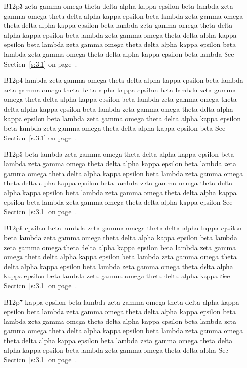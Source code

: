 B12p3 zeta gamma omega theta delta alpha kappa epsilon beta lambda zeta gamma omega theta delta alpha kappa epsilon beta lambda zeta gamma omega theta delta alpha kappa epsilon beta lambda zeta gamma omega theta delta alpha kappa epsilon beta lambda zeta gamma omega theta delta alpha kappa epsilon beta lambda zeta gamma omega theta delta alpha kappa epsilon beta lambda zeta gamma omega theta delta alpha kappa epsilon beta lambda See Section~\ref{s:3.1} on page~\pageref{s:3.1}.

B12p4 lambda zeta gamma omega theta delta alpha kappa epsilon beta lambda zeta gamma omega theta delta alpha kappa epsilon beta lambda zeta gamma omega theta delta alpha kappa epsilon beta lambda zeta gamma omega theta delta alpha kappa epsilon beta lambda zeta gamma omega theta delta alpha kappa epsilon beta lambda zeta gamma omega theta delta alpha kappa epsilon beta lambda zeta gamma omega theta delta alpha kappa epsilon beta See Section~\ref{s:3.1} on page~\pageref{s:3.1}.

B12p5 beta lambda zeta gamma omega theta delta alpha kappa epsilon beta lambda zeta gamma omega theta delta alpha kappa epsilon beta lambda zeta gamma omega theta delta alpha kappa epsilon beta lambda zeta gamma omega theta delta alpha kappa epsilon beta lambda zeta gamma omega theta delta alpha kappa epsilon beta lambda zeta gamma omega theta delta alpha kappa epsilon beta lambda zeta gamma omega theta delta alpha kappa epsilon See Section~\ref{s:3.1} on page~\pageref{s:3.1}.

B12p6 epsilon beta lambda zeta gamma omega theta delta alpha kappa epsilon beta lambda zeta gamma omega theta delta alpha kappa epsilon beta lambda zeta gamma omega theta delta alpha kappa epsilon beta lambda zeta gamma omega theta delta alpha kappa epsilon beta lambda zeta gamma omega theta delta alpha kappa epsilon beta lambda zeta gamma omega theta delta alpha kappa epsilon beta lambda zeta gamma omega theta delta alpha kappa See Section~\ref{s:3.1} on page~\pageref{s:3.1}.

B12p7 kappa epsilon beta lambda zeta gamma omega theta delta alpha kappa epsilon beta lambda zeta gamma omega theta delta alpha kappa epsilon beta lambda zeta gamma omega theta delta alpha kappa epsilon beta lambda zeta gamma omega theta delta alpha kappa epsilon beta lambda zeta gamma omega theta delta alpha kappa epsilon beta lambda zeta gamma omega theta delta alpha kappa epsilon beta lambda zeta gamma omega theta delta alpha See Section~\ref{s:3.1} on page~\pageref{s:3.1}.

